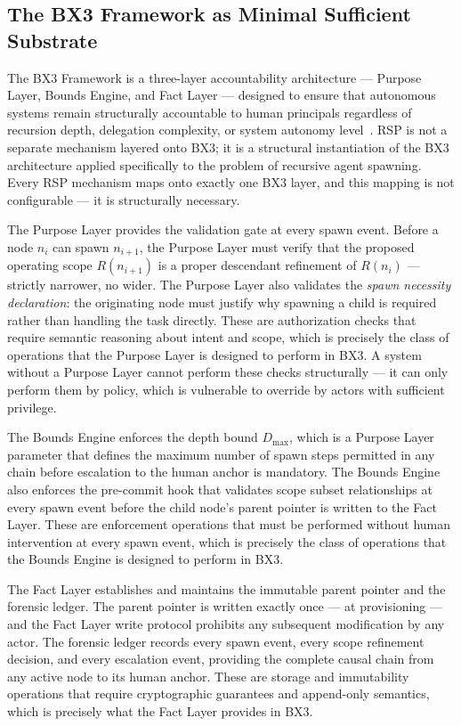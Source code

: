 \subsection{The BX3 Framework as Minimal Sufficient Substrate}

The BX3 Framework is a three-layer accountability architecture — Purpose Layer, Bounds Engine, and Fact Layer — designed to ensure that autonomous systems remain structurally accountable to human principals regardless of recursion depth, delegation complexity, or system autonomy level~\citep{bx3framework2026}. RSP is not a separate mechanism layered onto BX3; it is a structural instantiation of the BX3 architecture applied specifically to the problem of recursive agent spawning. Every RSP mechanism maps onto exactly one BX3 layer, and this mapping is not configurable — it is structurally necessary.

The Purpose Layer provides the validation gate at every spawn event. Before a node $n_i$ can spawn $n_{i+1}$, the Purpose Layer must verify that the proposed operating scope $R(n_{i+1})$ is a proper descendant refinement of $R(n_i)$ — strictly narrower, no wider. The Purpose Layer also validates the \textit{spawn necessity declaration}: the originating node must justify why spawning a child is required rather than handling the task directly. These are authorization checks that require semantic reasoning about intent and scope, which is precisely the class of operations that the Purpose Layer is designed to perform in BX3. A system without a Purpose Layer cannot perform these checks structurally — it can only perform them by policy, which is vulnerable to override by actors with sufficient privilege.

The Bounds Engine enforces the depth bound $D_{\max}$, which is a Purpose Layer parameter that defines the maximum number of spawn steps permitted in any chain before escalation to the human anchor is mandatory. The Bounds Engine also enforces the pre-commit hook that validates scope subset relationships at every spawn event before the child node's parent pointer is written to the Fact Layer. These are enforcement operations that must be performed without human intervention at every spawn event, which is precisely the class of operations that the Bounds Engine is designed to perform in BX3.

The Fact Layer establishes and maintains the immutable parent pointer and the forensic ledger. The parent pointer is written exactly once — at provisioning — and the Fact Layer write protocol prohibits any subsequent modification by any actor. The forensic ledger records every spawn event, every scope refinement decision, and every escalation event, providing the complete causal chain from any active node to its human anchor. These are storage and immutability operations that require cryptographic guarantees and append-only semantics, which is precisely what the Fact Layer provides in BX3.


